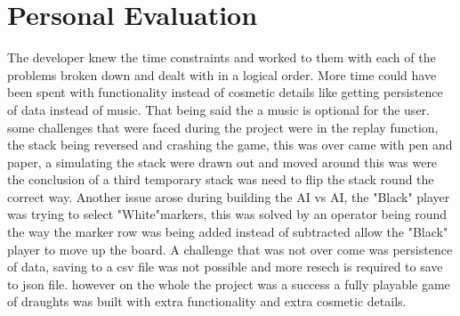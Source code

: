 \documentclass[10pt, a4paper]{article}
\begin{document}
	\section{Personal Evaluation}
	The developer knew the time constraints and worked to them with each of the problems broken down and dealt with in a logical order. More time could have been spent with functionality instead of cosmetic details like getting persistence of data instead of music. That being said the a music is optional for the user. some challenges that were faced during the project were in the replay function, the stack being reversed and crashing the game, this was over came with pen and paper, a simulating the stack were drawn out and moved around this was were the conclusion of a third temporary stack was need to flip the stack round the correct way. Another issue arose during building the AI vs AI, the "Black" player was trying to select "White"markers, this was solved by an operator being round the way the marker row was being added instead of subtracted allow the "Black" player to move up the board. A challenge that was not over come was persistence of data, saving to a csv file was not possible and more resech is required to save to json file. however on the whole the project was a success a fully playable game of draughts was built with extra functionality and extra cosmetic details. 
    
   
   


		
\end{document}
